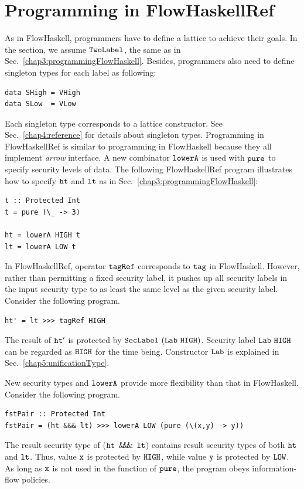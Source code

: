 \documentclass[a4paper]{report}
\newcommand{\arrowop}[1]{$#1\negthickspace #1\negthickspace #1$}
\newcommand{\co}[1]{$\cod{#1}$}
\begin{document}
\section{Programming in FlowHaskellRef}
\label{chap4:programmingFlowHaskellRef}
As in FlowHaskell, programmers have to define a lattice to achieve their goals.
In the section, we assume \co{TwoLabel}, the same as in Sec.~\ref{chap3:programmingFlowHaskell}.
Besides, programmers also need to define singleton types for each label as following:
\begin{Verbatim}[fontsize=\footnotesize]
data SHigh = VHigh
data SLow  = VLow
\end{Verbatim}
Each singleton type corresponds to a lattice constructor.
See Sec.~\ref{chap4:reference} for details about singleton types.
Programming in FlowHaskellRef is similar to programming in FlowHaskell because they all implement
{\em arrow} interface. 
A new combinator \co{lowerA} is used with \co{pure} to specify security levels of data.
The following FlowHaskellRef program illustrates how to specify \co{ht} and \co{lt} as in 
Sec.~\ref{chap3:programmingFlowHaskell}:
\begin{Verbatim}[fontsize=\footnotesize]
t :: Protected Int
t = pure (\_ -> 3)

ht = lowerA HIGH t
lt = lowerA LOW t
\end{Verbatim}
In FlowHaskellRef, operator \co{tagRef} corresponds to \co{tag} in FlowHaskell. 
However, rather than permitting a fixed security label, it pushes up all security labels in
the input security type to as least the same level as the given security label.
Consider the following program.
\begin{Verbatim}[fontsize=\footnotesize]
ht' = lt >>> tagRef HIGH
\end{Verbatim}
The result of \co{ht'} is protected by $\cod{SecLabel}\ (\cod{Lab}\ \cod{HIGH})$.
Security label $\mathtt{Lab}\ \mathtt{HIGH}$ can be regarded as \co{HIGH} for the time being.
Constructor \co{Lab} is explained in Sec.~\ref{chap5:unificationType}.

New security types and \co{lowerA} provide more flexibility than that in FlowHaskell.
Consider the following program.
\begin{Verbatim}[fontsize=\footnotesize]
fstPair :: Protected Int
fstPair = (ht &&& lt) >>> lowerA LOW (pure (\(x,y) -> y))
\end{Verbatim}
The result security type of (\co{ht} \arrowop{\&} \co{lt}) contains result security types
of both \co{ht} and \co{lt}. Thus, value \co{x} is protected by \co{HIGH}, while
value \co{y} is protected by \co{LOW}. As long as \co{x} is not used in the function of \co{pure},
the program obeys information-flow policies.
\end{document}
